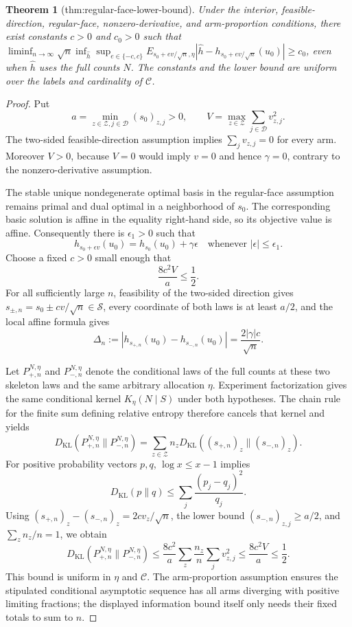 \documentclass{article}
\newtheorem{theorem}{Theorem}
\begin{document}
\begin{theorem}[thm:regular-face-lower-bound]\label{thm:regular-face-lower-bound}
Under the interior, feasible-direction, regular-face, nonzero-derivative, and arm-proportion conditions, there exist constants \(c>0\) and \(c_0>0\) such that \(\liminf_{n\to\infty}\sqrt n\inf_{\widehat h}\sup_{e\in\{-c,c\}}E_{s_0+ev/\sqrt n,\eta}|\widehat h-h_{s_0+ev/\sqrt n}(u_0)|\ge c_0\), even when \(\widehat h\) uses the full counts \(N\). The constants and the lower bound are uniform over the labels and cardinality of \(\mathcal C\).
\end{theorem}
\begin{proof}
Put
\[
a=\min_{z\in\mathcal Z,j\in\mathcal D}(s_0)_{z,j}>0,
\qquad
V=\max_{z\in\mathcal Z}\sum_{j\in\mathcal D}v_{z,j}^2.
\]
The two-sided feasible-direction assumption implies \(\sum_jv_{z,j}=0\) for every arm.  Moreover \(V>0\), because \(V=0\) would imply \(v=0\) and hence \(\gamma=0\), contrary to the nonzero-derivative assumption.

The stable unique nondegenerate optimal basis in the regular-face assumption remains primal and dual optimal in a neighborhood of \(s_0\).  The corresponding basic solution is affine in the equality right-hand side, so its objective value is affine.  Consequently there is \(\epsilon_1>0\) such that
\[
h_{s_0+\epsilon v}(u_0)=h_{s_0}(u_0)+\gamma\epsilon
\quad\text{whenever }|\epsilon|\le\epsilon_1.
\]
Choose a fixed \(c>0\) small enough that
\[
\frac{8c^2V}{a}\le\frac12.
\]
For all sufficiently large \(n\), feasibility of the two-sided direction gives \(s_{\pm,n}=s_0\pm cv/\sqrt n\in\mathcal S\), every coordinate of both laws is at least \(a/2\), and the local affine formula gives
\[
\Delta_n:=|h_{s_{+,n}}(u_0)-h_{s_{-,n}}(u_0)|
=\frac{2|\gamma|c}{\sqrt n}.
\]

Let \(P_{+,n}^{N,\eta}\) and \(P_{-,n}^{N,\eta}\) denote the conditional laws of the full counts at these two skeleton laws and the same arbitrary allocation \(\eta\).  Experiment factorization gives the same conditional kernel \(K_\eta(N\mid S)\) under both hypotheses.  The chain rule for the finite sum defining relative entropy therefore cancels that kernel and yields
\[
D_{\mathrm{KL}}(P_{+,n}^{N,\eta}\|P_{-,n}^{N,\eta})
=\sum_{z\in\mathcal Z}n_zD_{\mathrm{KL}}((s_{+,n})_z\|(s_{-,n})_z).
\]
For positive probability vectors \(p,q\), \(\log x\le x-1\) implies
\[
D_{\mathrm{KL}}(p\|q)
\le\sum_j\frac{(p_j-q_j)^2}{q_j}.
\]
Using \((s_{+,n})_z-(s_{-,n})_z=2cv_z/\sqrt n\), the lower bound \((s_{-,n})_{z,j}\ge a/2\), and \(\sum_zn_z/n=1\), we obtain
\[
D_{\mathrm{KL}}(P_{+,n}^{N,\eta}\|P_{-,n}^{N,\eta})
\le\frac{8c^2}{a}\sum_z\frac{n_z}{n}\sum_jv_{z,j}^2
\le\frac{8c^2V}{a}\le\frac12.
\]
This bound is uniform in \(\eta\) and \(\mathcal C\).  The arm-proportion assumption ensures the stipulated conditional asymptotic sequence has all arms diverging with positive limiting fractions; the displayed information bound itself only needs their fixed totals to sum to \(n\).


\end{proof}
\end{document}
